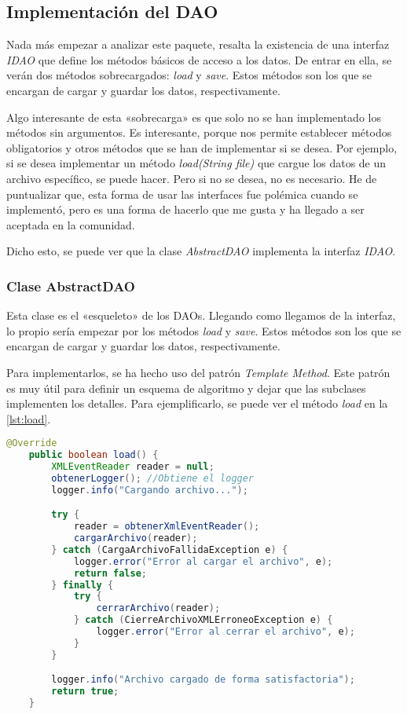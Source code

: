 \subsection{Implementación del DAO}\label{subsec:implementacion_del_dao}

Nada más empezar a analizar este paquete, resalta la existencia de una interfaz \textit{IDAO} que define los métodos básicos de acceso a los datos.
De entrar en ella, se verán dos métodos sobrecargados: \textit{load} y \textit{save}.
Estos métodos son los que se encargan de cargar y guardar los datos, respectivamente.

Algo interesante de esta «sobrecarga» es que solo no se han implementado los métodos sin argumentos.
Es interesante, porque nos permite establecer métodos obligatorios y otros métodos que se han
de implementar si se desea.
Por ejemplo, si se desea implementar un método \textit{load(String file)} que cargue los datos de un archivo específico, se puede hacer.
Pero si no se desea, no es necesario.
He de puntualizar que, esta forma de usar las interfaces fue polémica cuando se implementó\autocite{stackoverflow2014defaultforbidden},
    pero es una forma de hacerlo que me gusta y ha llegado a ser aceptada en la comunidad\autocite{mikemybytes2021defaultmethods}.

Dicho esto, se puede ver que la clase \textit{AbstractDAO} implementa la interfaz \textit{IDAO}.

\subsubsection{Clase AbstractDAO}\label{subsubsec:clase_abstractdao}
Esta clase es el «esqueleto» de los DAOs.
Llegando como llegamos de la interfaz, lo propio sería empezar por los métodos \textit{load} y \textit{save}.
Estos métodos son los que se encargan de cargar y guardar los datos, respectivamente.

Para implementarlos, se ha hecho uso del patrón \textit{Template Method}.
Este patrón es muy útil para definir un esquema de algoritmo y dejar que las subclases implementen los detalles.
Para ejemplificarlo, se puede ver el método \textit{load} en la \autoref{lst:load}.
\begin{lstlisting}[language=Java, caption={Método \textit{load} de la clase \textit{AbstractDAO}}, label={lst:load}]
    @Override
    public boolean load() {
        XMLEventReader reader = null;
        obtenerLogger(); //Obtiene el logger
        logger.info("Cargando archivo...");

        try {
            reader = obtenerXmlEventReader();
            cargarArchivo(reader);
        } catch (CargaArchivoFallidaException e) {
            logger.error("Error al cargar el archivo", e);
            return false;
        } finally {
            try {
                cerrarArchivo(reader);
            } catch (CierreArchivoXMLErroneoException e) {
                logger.error("Error al cerrar el archivo", e);
            }
        }

        logger.info("Archivo cargado de forma satisfactoria");
        return true;
    }
\end{lstlisting}

